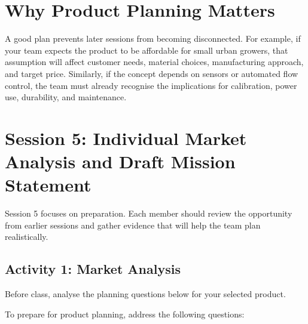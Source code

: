 \section{Why Product Planning Matters}

A good plan prevents later sessions from becoming disconnected. For example, if your team expects the product to be affordable for small urban growers, that assumption will affect customer needs, material choices, manufacturing approach, and target price. Similarly, if the concept depends on sensors or automated flow control, the team must already recognise the implications for calibration, power use, durability, and maintenance.

\section{Session 5: Individual Market Analysis and Draft Mission Statement}

Session 5 focuses on preparation. Each member should review the opportunity from earlier sessions and gather evidence that will help the team plan realistically.

\subsection{Activity 1: Market Analysis}

Before class, analyse the planning questions below for your selected product.



To prepare for product planning, address the following questions:

